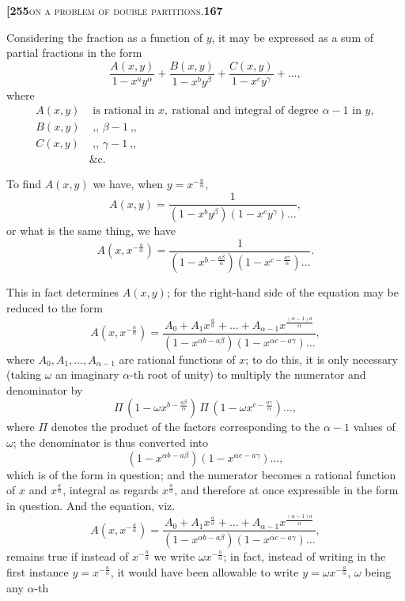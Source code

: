 \documentclass[11pt]{article}
\begin{document}
\newpage

\noindent\textbf{[255}\hfill\textsc{on a problem of double partitions.}\hfill\textbf{167}

\medskip

\noindent Considering the fraction as a function of $y$, it may be expressed as a sum of partial fractions in the form
\[
\frac{A(x, y)}{1 - x^a y^{\alpha}} + \frac{B(x, y)}{1 - x^b y^{\beta}} + \frac{C(x, y)}{1 - x^c y^{\gamma}} + \ldots,
\]
where
\begin{align*}
A(x, y) &\text{ is rational in } x,\ \text{rational and integral of degree } \alpha - 1 \text{ in } y,\\
B(x, y) &\text{ \ \ \ ,,\ \ \ \ \ \ \ \ \ \ \ \ \ \ \ \ \ \ \ \ \ \ \ \ \ \ \ \ \ \ \ \ \ \ \ \ \ \ } \beta - 1\ \text{,,}\\
C(x, y) &\text{ \ \ \ ,,\ \ \ \ \ \ \ \ \ \ \ \ \ \ \ \ \ \ \ \ \ \ \ \ \ \ \ \ \ \ \ \ \ \ \ \ \ \ } \gamma - 1\ \text{,,}\\
&\text{\&c.}
\end{align*}

To find $A(x, y)$ we have, when $y = x^{-\frac{a}{\alpha}}$,
\[
A(x, y) = \frac{1}{(1 - x^b y^{\beta})(1 - x^c y^{\gamma})\ldots},
\]
or what is the same thing, we have
\[
A(x, x^{-\frac{a}{\alpha}}) = \frac{1}{(1 - x^{b - \frac{a\beta}{\alpha}})(1 - x^{c - \frac{a\gamma}{\alpha}})\ldots}.
\]

This in fact determines $A(x, y)$; for the right-hand side of the equation may be reduced to the form
\[
A(x, x^{-\frac{a}{\alpha}}) = \frac{A_0 + A_1 x^{\frac{a}{\alpha}} + \ldots + A_{\alpha-1} x^{\frac{(\alpha-1)a}{\alpha}}}{(1 - x^{\alpha b - a\beta})(1 - x^{\alpha c - a\gamma})\ldots},
\]
where $A_0, A_1, \ldots, A_{\alpha-1}$ are rational functions of $x$; to do this, it is only necessary (taking $\omega$ an imaginary $\alpha$-th root of unity) to multiply the numerator and denominator by
\[
\Pi\,(1 - \omega x^{b - \frac{a\beta}{\alpha}})\,\Pi\,(1 - \omega x^{c - \frac{a\gamma}{\alpha}})\ldots,
\]
where $\Pi$ denotes the product of the factors corresponding to the $\alpha - 1$ values of $\omega$; the denominator is thus converted into
\[
(1 - x^{\alpha b - a\beta})(1 - x^{\alpha c - a\gamma})\ldots,
\]
which is of the form in question; and the numerator becomes a rational function of $x$ and $x^{\frac{a}{\alpha}}$, integral as regards $x^{\frac{a}{\alpha}}$, and therefore at once expressible in the form in question. And the equation, viz.
\[
A(x, x^{-\frac{a}{\alpha}}) = \frac{A_0 + A_1 x^{\frac{a}{\alpha}} + \ldots + A_{\alpha-1} x^{\frac{(\alpha-1)a}{\alpha}}}{(1 - x^{\alpha b - a\beta})(1 - x^{\alpha c - a\gamma})\ldots},
\]
remains true if instead of $x^{-\frac{a}{\alpha}}$ we write $\omega x^{-\frac{a}{\alpha}}$; in fact, instead of writing in the first instance $y = x^{-\frac{a}{\alpha}}$, it would have been allowable to write $y = \omega x^{-\frac{a}{\alpha}}$, $\omega$ being any $\alpha$-th
\end{document}
